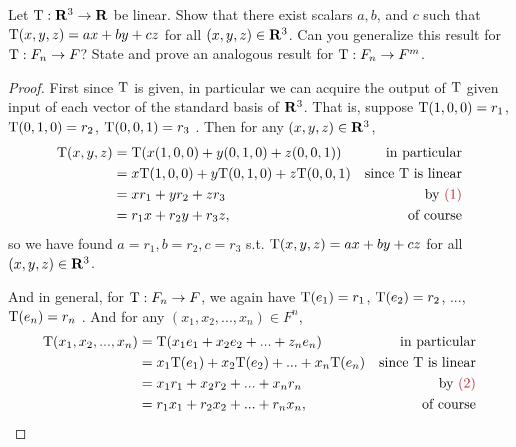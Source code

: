 \begin{exercise} \label{exercise 2.1.22}
Let \(\mathrm{T}: \mathbf{R}^3 \to \mathbf{R}\) be linear.
Show that there exist scalars \(a, b\), and \(c\) such that \(\mathrm{T}(x, y, z) = ax + by + cz\) for all \((x, y, z) \in \mathbf{R}^3\).
Can you generalize this result for \(\mathrm{T}: F_n \to F\)?
State and prove an analogous result for \(\mathrm{T}: F_n \to F^m\).
\end{exercise}

\begin{proof}
First since \(\mathrm{T}\) is given, in particular we can acquire the output of \(\mathrm{T}\) given input of each vector of the standard basis of \(\mathbf{R}^3\).
That is, suppose \(\mathrm{T}(1, 0, 0) = r_1\), \(\mathrm{T}(0, 1, 0) = r_2\), \(\mathrm{T}(0, 0, 1) = r_3\) .
Then for any \((x, y, z) \in \mathbf{R}^3\),
\begin{align*}
    \T(x, y, z) & = \T(x(1, 0, 0) + y(0, 1, 0) + z(0, 0, 1)) & \text{in particular} \\
                & = x\T(1, 0, 0) + y\T(0, 1, 0) + z\T(0, 0, 1) & \text{since \(\T\) is linear} \\
                & = x r_1 + y r_2 + z r_3 & \text{by \MAROON{(1)}} \\
                & = r_1 x + r_2 y + r_3 z, & \text{of course}
\end{align*}
so we have found \(a = r_1, b = r_2, c = r_3\) s.t. \(\mathrm{T}(x, y, z) = ax + by + cz\) for all \((x, y, z) \in \mathbf{R}^3\).

And in general, for \(\mathrm{T}: F_n \to F\), we again have \(\mathrm{T}(e_1) = r_1\), \(\mathrm{T}(e_2) = r_2\), ..., \(\mathrm{T}(e_n) = r_n\) .
And for any \((x_1, x_2, ..., x_n) \in F^n\),
\begin{align*}
    \T(x_1, x_2, ..., x_n) & = \T(x_1 e_1 + x_2 e_2 + ... + z_n e_n) & \text{in particular} \\
                & = x_1\T(e_1) + x_2\T(e_2) + ... + x_n\T(e_n) & \text{since \(\T\) is linear} \\
                & = x_1 r_1 + x_2 r_2 + ... + x_n r_n & \text{by \MAROON{(2)}} \\
                & = r_1 x_1 + r_2 x_2 + ... + r_n x_n, & \text{of course}
\end{align*}


\end{proof}
